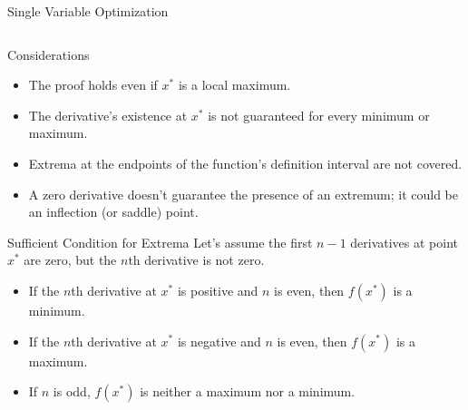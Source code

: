 \documentclass[
    NAME={Dr. Helga Ingimundardóttir},
    EMAIL={helgaingim@hi.is},
    FACULTY={Industrial Engineering},
    TITLE={Local and Global Optimization},
    SUBTITLE={Understanding Optima in Complex Landscapes},
    SEMINAR={VÉL113F},
    DATE={Design and Optimization},
    WIDE=true
]{../HI-latex/hi-beamer}
\begin{document}
\begin{frame}{Single Variable Optimization}
\begin{columns}
\begin{column}{0.6\textwidth}
            \end{column}
            \begin{column}{0.4\textwidth}
            \end{column}
        \end{columns}

        \begin{block}{Considerations}
            \begin{itemize}
                \item The proof holds even if \(x^*\) is a local maximum.
                \item The derivative's existence at \(x^*\) is not guaranteed for every minimum or maximum.
                \item Extrema at the endpoints of the function's definition interval are not covered.
                \item A zero derivative doesn't guarantee the presence of an extremum; it could be an inflection (or saddle) point.
            \end{itemize}
        \end{block}

        \framebreak
        \begin{block}{Sufficient Condition for Extrema}
            Let's assume the first \(n-1\) derivatives at point \(x^*\) are zero, but the \(n\)th derivative is not zero.

            \begin{itemize}
                \item If the \(n\)th derivative at \(x^*\) is positive and \(n\) is even, then \(f(x^*)\) is a minimum.
                \item If the \(n\)th derivative at \(x^*\) is negative and \(n\) is even, then \(f(x^*)\) is a maximum.
                \item If \(n\) is odd, \(f(x^*)\) is neither a maximum nor a minimum.
            \end{itemize}
        \end{block}


\end{frame}
\end{document}
